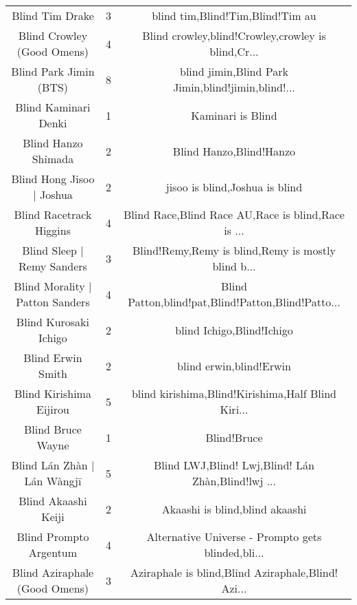 \begin{table}[h!]
{\begin{tabular}{|c|c|c|}
                                   Blind Tim Drake &      3 &                   blind tim,Blind!Tim,Blind!Tim au \\
                        Blind Crowley (Good Omens) &      4 & Blind crowley,blind!Crowley,crowley is blind,Cr... \\
                            Blind Park Jimin (BTS) &      8 & blind jimin,Blind Park Jimin,blind!jimin,blind!... \\
                              Blind Kaminari Denki &      1 &                                  Kaminari is Blind \\
                               Blind Hanzo Shimada &      2 &                            Blind Hanzo,Blind!Hanzo \\
                         Blind Hong Jisoo | Joshua &      2 &                     jisoo is blind,Joshua is blind \\
                           Blind Racetrack Higgins &      4 & Blind Race,Blind Race AU,Race is blind,Race is ... \\
                        Blind Sleep | Remy Sanders &      3 & Blind!Remy,Remy is blind,Remy is mostly blind b... \\
                   Blind Morality | Patton Sanders &      4 & Blind Patton,blind!pat,Blind!Patton,Blind!Patto... \\
                             Blind Kurosaki Ichigo &      2 &                          blind Ichigo,Blind!Ichigo \\
                                 Blind Erwin Smith &      2 &                            blind erwin,blind!Erwin \\
                           Blind Kirishima Eijirou &      5 & blind kirishima,Blind!Kirishima,Half Blind Kiri... \\
                                 Blind Bruce Wayne &      1 &                                        Blind!Bruce \\
                       Blind Lán Zhàn | Lán Wàngjī &      5 & Blind LWJ,Blind! Lwj,Blind! Lán Zhàn,Blind!lwj ... \\
                               Blind Akaashi Keiji &      2 &                     Akaashi is blind,blind akaashi \\
                            Blind Prompto Argentum &      4 & Alternative Universe - Prompto gets blinded,bli... \\
                     Blind Aziraphale (Good Omens) &      3 & Aziraphale is blind,Blind Aziraphale,Blind! Azi... \\

\end{tabular}}
\end{table}
